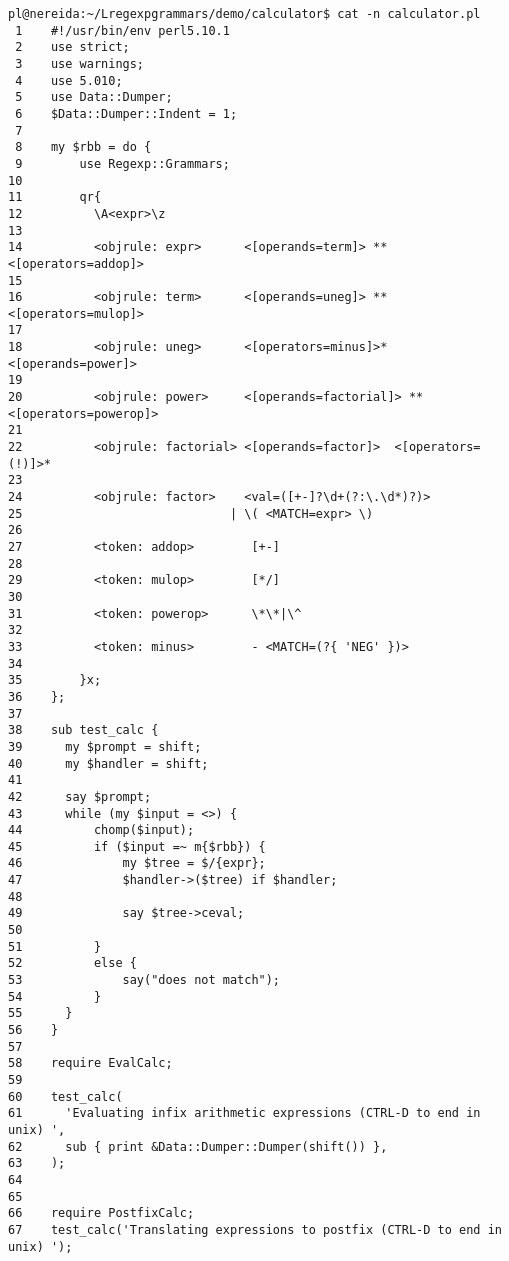 \begin{latexonly}
\begin{verbatim}
pl@nereida:~/Lregexpgrammars/demo/calculator$ cat -n calculator.pl
 1    #!/usr/bin/env perl5.10.1
 2    use strict;
 3    use warnings;
 4    use 5.010;
 5    use Data::Dumper;
 6    $Data::Dumper::Indent = 1;
 7  
 8    my $rbb = do {
 9        use Regexp::Grammars;
10  
11        qr{
12          \A<expr>\z
13  
14          <objrule: expr>      <[operands=term]> ** <[operators=addop]>
15  
16          <objrule: term>      <[operands=uneg]> ** <[operators=mulop]>
17  
18          <objrule: uneg>      <[operators=minus]>* <[operands=power]>
19  
20          <objrule: power>     <[operands=factorial]> ** <[operators=powerop]>
21  
22          <objrule: factorial> <[operands=factor]>  <[operators=(!)]>*
23  
24          <objrule: factor>    <val=([+-]?\d+(?:\.\d*)?)>
25                             | \( <MATCH=expr> \)
26  
27          <token: addop>        [+-]
28  
29          <token: mulop>        [*/]
30  
31          <token: powerop>      \*\*|\^
32  
33          <token: minus>        - <MATCH=(?{ 'NEG' })>
34  
35        }x;
36    };
37  
38    sub test_calc {
39      my $prompt = shift;
40      my $handler = shift;
41  
42      say $prompt;
43      while (my $input = <>) {
44          chomp($input);
45          if ($input =~ m{$rbb}) {
46              my $tree = $/{expr};
47              $handler->($tree) if $handler;
48  
49              say $tree->ceval;
50  
51          }
52          else {
53              say("does not match");
54          }
55      }
56    }
57  
58    require EvalCalc;
59  
60    test_calc(
61      'Evaluating infix arithmetic expressions (CTRL-D to end in unix) ',
62      sub { print &Data::Dumper::Dumper(shift()) },
63    );
64  
65  
66    require PostfixCalc;
67    test_calc('Translating expressions to postfix (CTRL-D to end in unix) ');
\end{verbatim}
\end{latexonly}
